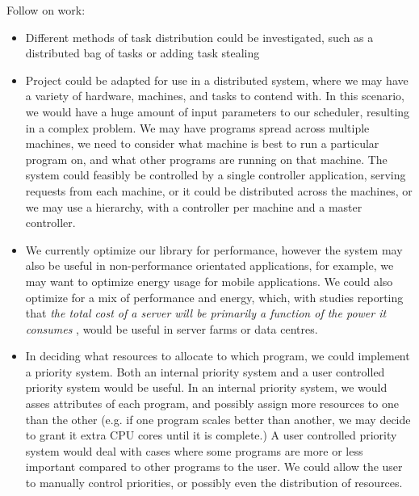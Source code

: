 Follow on work:

\begin{itemize}
	\item Different methods of task distribution could be investigated, such as a distributed bag of tasks or adding task stealing
	\item Project could be adapted for use in a distributed system, where we may have a variety of hardware, machines, and tasks to contend with. In this scenario, we would have a huge amount of input parameters to our scheduler, resulting in a complex problem. We may have programs spread across multiple machines, we need to consider what machine is best to run a particular program on, and what other programs are running on that machine. The system could feasibly be controlled by a single controller application, serving requests from each machine, or it could be distributed across the machines, or we may use a hierarchy, with a controller per machine and a master controller. 
	\item We currently optimize our library for performance, however the system may also be useful in non-performance orientated applications, for example, we may want to optimize energy usage for mobile applications. We could also optimize for a mix of performance and energy, which, with studies reporting that \textit{the total cost of a server will be primarily a function of the power it consumes} \cite{datacentres}, would be useful in server farms or data centres.
	\item In deciding what resources to allocate to which program, we could implement a priority system. Both an internal priority system and a user controlled priority system would be useful. In an internal priority system, we would asses attributes of each program, and possibly assign more resources to one than the other (e.g. if one program scales better than another, we may decide to grant it extra CPU cores until it is complete.) A user controlled priority system would deal with cases where some programs are more or less important compared to other programs to the user. We could allow the user to manually control priorities, or possibly even the distribution of resources. 
\end{itemize}